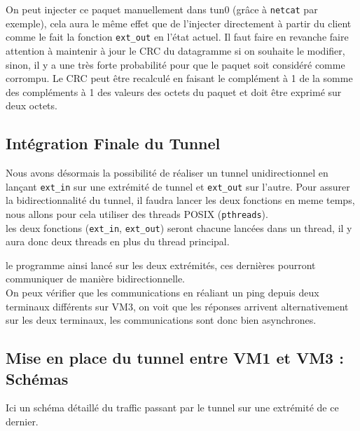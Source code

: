 \documentclass[a4paper, 10pt]{article}
\begin{document}
      On peut injecter ce paquet manuellement dans tun0 (grâce à \verb+netcat+
      par exemple), cela aura le même effet que de l'injecter directement à
      partir du client comme le fait la fonction \verb+ext_out+ en l'état
      actuel. Il faut faire en revanche faire attention à maintenir à jour le
      CRC du datagramme si on souhaite le modifier, sinon, il y a une très forte
      probabilité pour que le paquet soit considéré comme corrompu. Le CRC peut
      être recalculé en faisant le complément à 1 de la somme des compléments à
      1 des valeurs des octets du paquet et doit être exprimé sur deux octets.

    \subsection{Intégration Finale du Tunnel}
      Nous avons désormais la possibilité de réaliser un tunnel unidirectionnel
      en lançant \verb+ext_in+ sur une extrémité de tunnel et \verb+ext_out+ sur
      l'autre. Pour assurer la bidirectionnalité du tunnel, il faudra lancer les
      deux fonctions en meme temps, nous allons pour cela utiliser des threads
      POSIX (\verb+pthreads+). \\

      les deux fonctions (\verb+ext_in+, \verb+ext_out+) seront chacune lancées
      dans un thread, il y aura donc deux threads en plus du thread principal.

      le programme ainsi lancé sur les deux extrémités, ces dernières pourront
      communiquer de manière bidirectionnelle. \\

      On peux vérifier que les communications en réaliant un ping depuis deux
      terminaux différents sur VM3, on voit que les réponses arrivent
      alternativement sur les deux terminaux, les communications sont donc bien
      asynchrones.

    \newpage
    \subsection{Mise en place du tunnel entre VM1 et VM3 : Schémas}
      Ici un schéma détaillé du traffic passant par le tunnel sur une extrémité
      de ce dernier.
\end{document}
